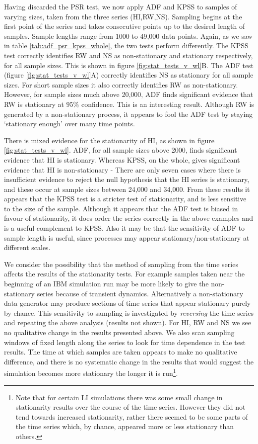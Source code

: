 Having discarded the PSR test, we now apply ADF and KPSS to samples of varying sizes, taken from the three series (HI,RW,NS). Sampling begins at the first point of the series and takes consecutive points up to the desired length of samples. Sample lengths range from 1000 to 49,000 data points. Again, as we saw in table \ref{tab:adf_psr_kpss_whole}, the two tests perform differently. The KPSS test correctly identifies RW and NS as non-stationary and stationary respectively, for all sample sizes. This is shown in figure \ref{fig:stat_tests_v_wl}B. The ADF test (figure \ref{fig:stat_tests_v_wl}A) correctly identifies NS as stationary for all sample sizes.  For short sample sizes it also correctly identifies RW as non-stationary. However, for sample sizes much above 20,000, ADF finds significant evidence that RW is stationary at $95\%$ confidence. This is an interesting result. Although RW is generated by a non-stationary process, it appears to fool the ADF test by staying `stationary enough' over many time points. 
  
There is mixed evidence for the stationarity of HI, as shown in figure \ref{fig:stat_tests_v_wl}. ADF, for all sample sizes above 2000, finds significant evidence that HI is stationary. Whereas KPSS, on the whole, gives significant evidence that HI is non-stationary - There are only seven cases where there is insufficient evidence to reject the null hypothesis that the HI series is stationary, and these occur at sample sizes between 24,000 and 34,000. From these results it appears that the KPSS test is a stricter test of stationarity, and is less sensitive to the size of the sample. Although it appears that the ADF test is biased in favour of stationarity, it does order the series correctly in the above examples and is a useful complement to KPSS. Also it may be that the sensitivity of ADF to sample length is useful, since processes may appear stationary/non-stationary at different scales. 

We consider the possibility that the method of sampling from the time series affects the results of the stationarity tests. For example samples taken near the beginning of an IBM simulation run may be more likely to give the non-stationary series because of transient dynamics. Alternatively a non-stationary data generator may produce sections of time series that appear stationary purely by chance. This sensitivity to sampling is investigated by \emph{reversing} the time series and repeating the above analysis (results not shown). For HI, RW and NS we see no qualitative change in the results presented above. We also scan sampling windows of fixed length along the series to look for time dependence in the test results. The time at which samples are taken appears to make no qualitative difference, and there is no systematic change in the results that would suggest the simulation becomes more stationary the longer it is run\footnote{Note that for certain LI simulations there was some small change in stationarity results over the course of the time series. However they did not tend towards increased stationarity, rather there seemed to be some parts of the time series which, by chance, appeared more or less stationary than others.}. 


